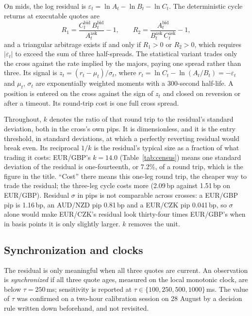 \documentclass[11pt]{article}
\begin{document}
On mids, the log residual is
$\varepsilon_t = \ln A_t - \ln B_t - \ln C_t$. The deterministic cycle
returns at executable quotes are
\[
R_1 = \frac{C^{\text{bid}}_t\,B^{\text{bid}}_t}{A^{\text{ask}}_t} - 1,
\qquad
R_2 = \frac{A^{\text{bid}}_t}{B^{\text{ask}}_t\,C^{\text{ask}}_t} - 1,
\]
and a triangular arbitrage exists if and only if $R_1 > 0$ or
$R_2 > 0$, which requires $|\varepsilon_t|$ to exceed the sum of three
half-spreads. The statistical variant trades only the cross against the
rate implied by the majors, paying one spread rather than three. Its
signal is $z_t = (r_t - \mu_t)/\sigma_t$, where
$r_t = \ln C_t - \ln(A_t/B_t) = -\varepsilon_t$ and $\mu_t$, $\sigma_t$
are exponentially weighted moments with a 300-second half-life. A
position is entered on the cross against the sign of $z_t$ and closed
on reversion or after a timeout. Its round-trip cost is one full cross
spread.

Throughout, $k$ denotes the ratio of that round trip to the residual's
standard deviation, both in the cross's own pips. It is dimensionless,
and it is the entry threshold, in standard deviations, at which a
perfectly reverting residual would break even. Its reciprocal $1/k$ is
the residual's typical size as a fraction of what trading it costs:
EUR/GBP's $k = 14.0$ (Table~\ref{tab:census}) means one standard
deviation of the residual is one-fourteenth, or 7.2\%, of a round
trip, which is the figure in the title. ``Cost'' there means this
one-leg round trip, the cheaper way to trade the residual; the
three-leg cycle costs more (2.09\,bp against 1.51\,bp on EUR/GBP).
Residual $\sigma$ in
pips is not comparable across crosses: a EUR/GBP pip is 1.16\,bp, an
AUD/NZD pip 0.81\,bp and a EUR/CZK pip 0.041\,bp, so $\sigma$ alone
would make EUR/CZK's residual look thirty-four times EUR/GBP's when in
basis points it is only slightly larger. $k$ removes the unit.

\subsection{Synchronization and clocks}\label{sec:clocks}

The residual is only meaningful when all three quotes are current. An
observation is \emph{synchronized} if all three quote ages, measured on
the local monotonic clock, are below $\tau = 250$\,ms; sensitivity is
reported at $\tau \in \{100, 250, 500, 1000\}$\,ms. The value of $\tau$
was confirmed on a two-hour calibration session on 28 August by a
decision rule written down beforehand, and not revisited.
\end{document}
